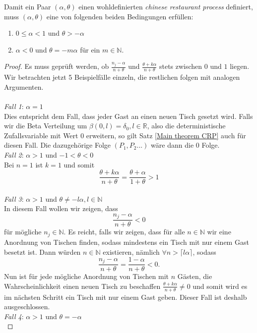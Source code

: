 \begin{lemma}
    \label{lemma cases crp}
    Damit ein Paar $(\alpha,\theta)$ einen wohldefinierten \textit{chinese restaurant process} definiert, muss $(\alpha,\theta)$ eine von folgenden beiden Bedingungen erfüllen:
    \begin{enumerate}
        \item $0 \leq \alpha < 1$ und $\theta > -\alpha$
        \item $\alpha < 0$ und $\theta = -m \alpha$ für ein $m \in \mathbb{N}$.
    \end{enumerate} 
\end{lemma}
\begin{proof}
Es muss geprüft werden, ob $\frac{n_j- \alpha}{n+\theta}$ und $\frac{\theta + k\alpha}{n + \theta}$  stets zwischen $0$ und $1$ liegen. Wir betrachten jetzt 5 Beispielfälle einzeln, die restlichen folgen mit analogen Argumenten.\\
\\
\textit{Fall 1}: $\alpha =1$\\
Dies entspricht dem Fall, dass jeder Gast an einen neuen Tisch gesetzt wird. Falls wir die Beta Verteilung um $\beta(0,l) = \delta_0, l \in \mathbb{R}$, also die deterministische Zufallsvariable mit Wert 0 erweitern, so gilt Satz \ref{Main theorem CRP} auch für diesen Fall. Die dazugehörige Folge $(P_1,P_2...)$ wäre dann die $0$ Folge.
\\
\textit{Fall 2}: $\alpha >1$ und $-1<\theta< 0$\\
Bei $n=1$ ist $k=1$ und somit 
\[\frac{\theta + k\alpha}{n + \theta} = \frac{\theta + \alpha}{1 + \theta} > 1
\] \\ 
\textit{Fall 3}: $\alpha >1$ und $\theta \neq -l\alpha, l \in \mathbb{N}$\\
In diesem Fall wollen wir zeigen, dass 
\[
\frac{n_j-\alpha}{n + \theta}<0
\]
 für mögliche $n_j \in \mathbb{N}$. Es reicht, falls wir zeigen, dass für alle $n \in \mathbb{N}$ wir eine Anordnung von Tischen finden, sodass mindestens ein Tisch mit nur einem Gast besetzt ist. Dann würden $n \in \mathbb{N}$ existieren, nämlich $\forall n > \lceil l \alpha \rceil$, sodass 
 \[
 \frac{n_j-\alpha}{n + \theta}= \frac{1-\alpha}{n + \theta}<0.
 \] 
 Nun ist für jede mögliche Anordnung von Tischen mit $n$ Gästen, die Wahrscheinlichkeit einen neuen Tisch zu beschaffen $\frac{\theta + k\alpha}{n + \theta} \neq 0$ und somit wird es im nächsten Schritt ein Tisch mit nur einem Gast geben. Dieser Fall ist deshalb ausgeschlossen.\\
\textit{Fall 4}: $\alpha >1$ und $\theta = -\alpha$\\

\end{proof}
